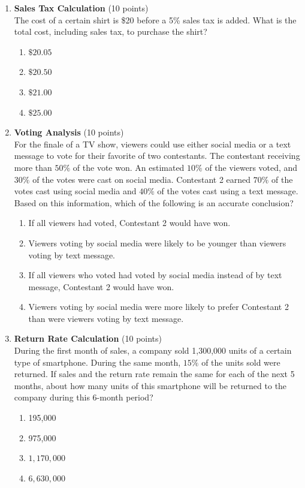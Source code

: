\begin{enumerate}
  \item \textbf{Sales Tax Calculation} (10 points)\\
  The cost of a certain shirt is \$20 before a 5\% sales tax is added. What is the total cost, including sales tax, to purchase the shirt?
  \begin{enumerate}[label=(\Alph*)]
    \item $\$ 20.05$
    \item $\$ 20.50$
    \item $\$ 21.00$
    \item $\$ 25.00$
  \end{enumerate}
  \begin{subanswer}
  \end{subanswer}

  \item \textbf{Voting Analysis} (10 points)\\
  For the finale of a TV show, viewers could use either social media or a text message to vote for their favorite of two contestants. The contestant receiving more than $50\%$ of the vote won. An estimated $10\%$ of the viewers voted, and $30\%$ of the votes were cast on social media. Contestant 2 earned $70\%$ of the votes cast using social media and $40\%$ of the votes cast using a text message. Based on this information, which of the following is an accurate conclusion?
  \begin{enumerate}[label=(\Alph*)]
    \item If all viewers had voted, Contestant 2 would have won.
    \item Viewers voting by social media were likely to be younger than viewers voting by text message.
    \item If all viewers who voted had voted by social media instead of by text message, Contestant 2 would have won.
    \item Viewers voting by social media were more likely to prefer Contestant 2 than were viewers voting by text message.
  \end{enumerate}
  \begin{subanswer}
  \end{subanswer}

  \item \textbf{Return Rate Calculation} (10 points)\\
  During the first month of sales, a company sold 1,300,000 units of a certain type of smartphone. During the same month, $15\%$ of the units sold were returned. If sales and the return rate remain the same for each of the next 5 months, about how many units of this smartphone will be returned to the company during this 6-month period?
  \begin{enumerate}[label=(\Alph*)]
    \item 195,000
    \item 975,000
    \item $1,170,000$
    \item $6,630,000$
  \end{enumerate}
  \begin{subanswer}
  \end{subanswer}


\end{enumerate}
